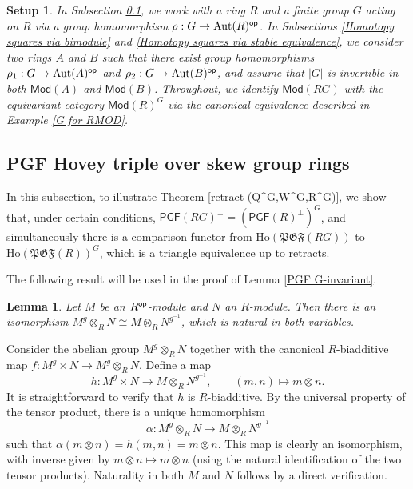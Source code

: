 \documentclass[12pt,twoside]{amsart}
\theoremstyle{bfupright head,slanted body}
\theoremstyle{bfupright head,upright body}
\theoremstyle{fixed bf head,slanted body}
\newtheorem{lem}[res]{Lemma}            \newtheorem*{lem*}{Lemma}
\theoremstyle{fixed bf head,upright body}
\newtheorem{setup}[res]{Setup}           \newtheorem*{setup*}{Setup}
\theoremstyle{numbered paragraph}
\newenvironment{prf*}[1][Proof]{%
  \begin{proof}[\bf #1]
    \setcounter{equation}{0}
    \renewcommand{\theequation}{\arabic{equation}}}
  {\end{proof}
}
\numberwithin{equation}{res}
\newcommand{\PGF}{\mathsf{PGF}}
\newcommand{\Mod}{\mathsf{Mod}}
\newcommand{\Ho}{\mathrm{Ho}}
\newcommand{\Rop}{R^{\sf op}}
\newcommand{\op}{\sf op}
\newcommand{\Aut}{\operatorname{Aut}}
\begin{document}
\begin{setup}
In Subsection \ref{Abelian model structures on Mod(RG)}, we work with a ring $R$ and a finite group $G$ acting on $R$ via a group homomorphism $\rho : G \to \Aut(R)^{\op}$.
In Subsections \ref{Homotopy squares via bimodule} and \ref{Homotopy squares via stable equivalence}, we consider two rings $A$ and $B$ such that there exist group homomorphisms $\rho_1 : G \to \Aut(A)^{\op}$ and $\rho_2 : G \to \Aut(B)^{\op}$, and assume that $|G|$ is invertible in both $\Mod(A)$ and $\Mod(B)$.
Throughout, we identify $\Mod(RG)$ with the equivariant category $\Mod(R)^G$ via the canonical equivalence described in Example \ref{G for RMOD}.
\end{setup}

\subsection{PGF Hovey triple over skew group rings}
\label{Abelian model structures on Mod(RG)}%
\noindent
In this subsection, to illustrate Theorem \ref{retract (Q^G,W^G,R^G)}, we show that, under certain conditions, $\PGF(RG)^\bot = (\PGF(R)^\bot)^G$, and simultaneously there is a comparison functor
from $\Ho(\mathfrak{PGF}(RG))$ to $\Ho(\mathfrak{PGF}(R))^G$,
which is a triangle equivalence up to retracts.

The following result will be used in the proof of Lemma \ref{PGF G-invariant}.

\begin{lem} \label{tensor product}
Let $M$ be an $\Rop$-module and $N$ an $R$-module.
Then there is an isomorphism $M^g\otimes_RN \cong M\otimes_R N^{g^{-1}}$, which is natural in both variables.
\end{lem}

\begin{prf*}
Consider the abelian group \(M^g\otimes_R N\) together with the canonical \(R\)-biadditive map \(f:M^g\times N\to M^g\otimes_R N\). Define a map
\[
h:M^g\times N \longrightarrow M\otimes_R N^{g^{-1}},\qquad (m,n)\longmapsto m\otimes n.
\]
It is straightforward to verify that \(h\) is \(R\)-biadditive. By the universal property of the tensor product, there is a unique homomorphism
\[
\alpha:M^g\otimes_R N \longrightarrow M\otimes_R N^{g^{-1}}
\]
such that \(\alpha(m\otimes n)=h(m,n)=m\otimes n\). This map is clearly an isomorphism, with inverse given by \(m\otimes n\mapsto m\otimes n\) (using the natural identification of the two tensor products). Naturality in both \(M\) and \(N\) follows by a direct verification.
\end{prf*}
\end{document}
